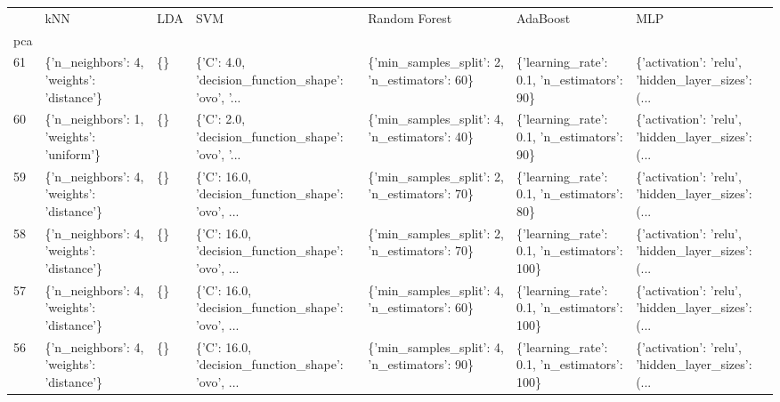 \begin{tabular}{lllllll}
\toprule
{} &                                        kNN & LDA &                                                SVM &                                  Random Forest &                                     AdaBoost &                                                MLP \\
pca &                                            &     &                                                    &                                                &                                              &                                                    \\
\midrule
61  &  \{'n\_neighbors': 4, 'weights': 'distance'\} &  \{\} &  \{'C': 4.0, 'decision\_function\_shape': 'ovo', '... &   \{'min\_samples\_split': 2, 'n\_estimators': 60\} &   \{'learning\_rate': 0.1, 'n\_estimators': 90\} &  \{'activation': 'relu', 'hidden\_layer\_sizes': (... \\
60  &   \{'n\_neighbors': 1, 'weights': 'uniform'\} &  \{\} &  \{'C': 2.0, 'decision\_function\_shape': 'ovo', '... &   \{'min\_samples\_split': 4, 'n\_estimators': 40\} &   \{'learning\_rate': 0.1, 'n\_estimators': 90\} &  \{'activation': 'relu', 'hidden\_layer\_sizes': (... \\
59  &  \{'n\_neighbors': 4, 'weights': 'distance'\} &  \{\} &  \{'C': 16.0, 'decision\_function\_shape': 'ovo', ... &   \{'min\_samples\_split': 2, 'n\_estimators': 70\} &   \{'learning\_rate': 0.1, 'n\_estimators': 80\} &  \{'activation': 'relu', 'hidden\_layer\_sizes': (... \\
58  &  \{'n\_neighbors': 4, 'weights': 'distance'\} &  \{\} &  \{'C': 16.0, 'decision\_function\_shape': 'ovo', ... &   \{'min\_samples\_split': 2, 'n\_estimators': 70\} &  \{'learning\_rate': 0.1, 'n\_estimators': 100\} &  \{'activation': 'relu', 'hidden\_layer\_sizes': (... \\
57  &  \{'n\_neighbors': 4, 'weights': 'distance'\} &  \{\} &  \{'C': 16.0, 'decision\_function\_shape': 'ovo', ... &   \{'min\_samples\_split': 4, 'n\_estimators': 60\} &  \{'learning\_rate': 0.1, 'n\_estimators': 100\} &  \{'activation': 'relu', 'hidden\_layer\_sizes': (... \\
56  &  \{'n\_neighbors': 4, 'weights': 'distance'\} &  \{\} &  \{'C': 16.0, 'decision\_function\_shape': 'ovo', ... &   \{'min\_samples\_split': 4, 'n\_estimators': 90\} &  \{'learning\_rate': 0.1, 'n\_estimators': 100\} &  \{'activation': 'relu', 'hidden\_layer\_sizes': (... \\

\end{tabular}
